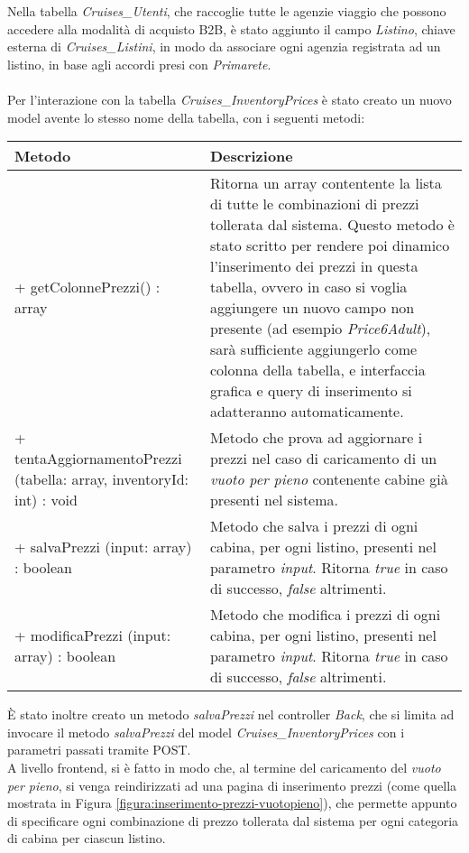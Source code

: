 Nella tabella \textit{Cruises\_Utenti}, che raccoglie tutte le agenzie viaggio che possono accedere alla modalità di acquisto B2B, è stato aggiunto il campo \textit{Listino}, chiave esterna di \textit{Cruises\_Listini}, in modo da associare ogni agenzia registrata ad un listino, in base agli accordi presi con \textit{Primarete}. \\ \\
Per l'interazione con la tabella \textit{Cruises\_InventoryPrices} è stato creato un nuovo model avente lo stesso nome della tabella, con i seguenti metodi: 
\begin{center}
	\def\arraystretch{1.5}
	\begin{longtable}{ >{\raggedright}p{5.5cm} p{6.8cm}} 
		\hline
		\textbf{Metodo} & \textbf{Descrizione} \\ \hline
		+ getColonnePrezzi() : array & Ritorna un array contentente la lista di tutte le combinazioni di prezzi tollerata dal sistema. Questo metodo è stato scritto per rendere poi dinamico l'inserimento dei prezzi in questa tabella, ovvero in caso si voglia aggiungere un nuovo campo non presente (ad esempio \textit{Price6Adult}), sarà sufficiente aggiungerlo come colonna della tabella, e interfaccia grafica e query di inserimento si adatteranno automaticamente. \\
		\hline
		+ tentaAggiornamentoPrezzi (tabella: array, inventoryId: int) : void & Metodo che prova ad aggiornare i prezzi nel caso di caricamento di un \textit{vuoto per pieno} contenente cabine già presenti nel sistema.\\
		\hline
		+ salvaPrezzi (input: array) : boolean & Metodo che salva i prezzi di ogni cabina, per ogni listino, presenti nel parametro \textit{input}. Ritorna \textit{true} in caso di successo, \textit{false} altrimenti.\\
		\hline
		+ modificaPrezzi (input: array) : boolean & Metodo che modifica i prezzi di ogni cabina, per ogni listino, presenti nel parametro \textit{input}. Ritorna \textit{true} in caso di successo, \textit{false} altrimenti.\\
		\hline
	\end{longtable}
\end{center}
È stato inoltre creato un metodo \textit{salvaPrezzi} nel controller \textit{Back}, che si limita ad invocare il metodo \textit{salvaPrezzi} del model \textit{Cruises\_InventoryPrices} con i parametri passati tramite POST.\\
A livello frontend, si è fatto in modo che, al termine del caricamento del \textit{vuoto per pieno}, si venga reindirizzati ad una pagina di inserimento prezzi (come quella mostrata in Figura \ref{figura:inserimento-prezzi-vuotopieno}), che permette appunto di specificare ogni combinazione di prezzo tollerata dal sistema per ogni categoria di cabina per ciascun listino. 
